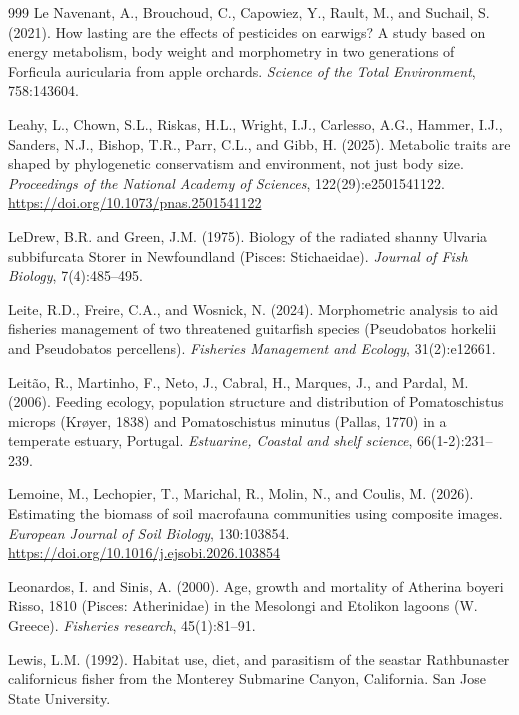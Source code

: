 \begin{thebibliography}{999}
Le Navenant, A., Brouchoud, C., Capowiez, Y., Rault, M., and Suchail, S. (2021). How lasting are the effects of pesticides on earwigs? A study based on energy metabolism, body weight and morphometry in two generations of Forficula auricularia from apple orchards. \textit{Science of the Total Environment}, 758:143604.

Leahy, L., Chown, S.L., Riskas, H.L., Wright, I.J., Carlesso, A.G., Hammer, I.J., Sanders, N.J., Bishop, T.R., Parr, C.L., and Gibb, H. (2025). Metabolic traits are shaped by phylogenetic conservatism and environment, not just body size. \textit{Proceedings of the National Academy of Sciences}, 122(29):e2501541122. \url{https://doi.org/10.1073/pnas.2501541122}

LeDrew, B.R. and Green, J.M. (1975). Biology of the radiated shanny Ulvaria subbifurcata Storer in Newfoundland (Pisces: Stichaeidae). \textit{Journal of Fish Biology}, 7(4):485--495.

Leite, R.D., Freire, C.A., and Wosnick, N. (2024). Morphometric analysis to aid fisheries management of two threatened guitarfish species (Pseudobatos horkelii and Pseudobatos percellens). \textit{Fisheries Management and Ecology}, 31(2):e12661.

Leit{\~a}o, R., Martinho, F., Neto, J., Cabral, H., Marques, J., and Pardal, M. (2006). Feeding ecology, population structure and distribution of Pomatoschistus microps (Kr{\o}yer, 1838) and Pomatoschistus minutus (Pallas, 1770) in a temperate estuary, Portugal. \textit{Estuarine, Coastal and shelf science}, 66(1-2):231--239.

Lemoine, M., Lechopier, T., Marichal, R., Molin, N., and Coulis, M. (2026). Estimating the biomass of soil macrofauna communities using composite images. \textit{European Journal of Soil Biology}, 130:103854. \url{https://doi.org/10.1016/j.ejsobi.2026.103854}

Leonardos, I. and Sinis, A. (2000). Age, growth and mortality of Atherina boyeri Risso, 1810 (Pisces: Atherinidae) in the Mesolongi and Etolikon lagoons (W. Greece). \textit{Fisheries research}, 45(1):81--91.

Lewis, L.M. (1992). Habitat use, diet, and parasitism of the seastar Rathbunaster californicus fisher from the Monterey Submarine Canyon, California. San Jose State University.


\end{thebibliography}
